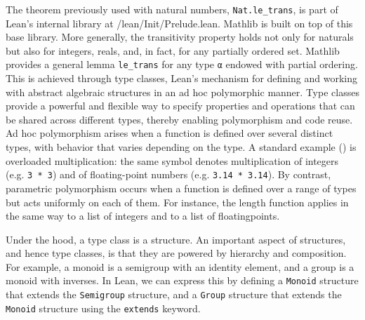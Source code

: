 The theorem previously used with natural numbers, \lstinline[language=lean]|Nat.le_trans|, 
is part of Lean’s internal library at /lean/Init/Prelude.lean. 
Mathlib is built on top of this base library.
More generally, the transitivity property holds not only for naturals but also for integers, 
reals, and, in fact, for any partially ordered set. 
Mathlib provides a general lemma \lstinline[language=lean]|le_trans| for any type 
\lstinline[language=lean]|α| endowed with partial ordering.
This is achieved through type classes, Lean’s mechanism for defining and working with 
abstract algebraic structures in an ad hoc polymorphic manner.
Type classes provide a powerful and flexible way to specify properties and 
operations that can be shared across different types, thereby enabling 
polymorphism and code reuse.
Ad hoc polymorphism arises when a function is defined over several distinct types, 
with behavior that varies depending on the type. A standard example (\cite{wadler_blott_ad_hoc_polymorphism_1988}) is overloaded 
multiplication: the same symbol denotes multiplication of integers 
(e.g. \lstinline[language=lean]|3 * 3|) and of floating-point numbers 
(e.g. \lstinline[language=lean]|3.14 * 3.14|).
By contrast, parametric polymorphism occurs when a function is defined over a 
range of types but acts uniformly on each of them. For instance, the length 
function applies in the same way to a list of integers and to a list of 
floatingpoints.

Under the hood, a type class is a structure. An important aspect of structures,
and hence type classes, is that they are powered by hierarchy and composition.
For example, a monoid is a semigroup with an identity element, and a group is a monoid with inverses. In Lean, we can express this
by defining a \lstinline[language=lean]|Monoid| structure that extends 
the \lstinline[language=lean]|Semigroup| structure, 
and a \lstinline[language=lean]|Group| structure 
that extends the \lstinline[language=lean]|Monoid| structure
using the \lstinline[language=lean]|extends| keyword.


